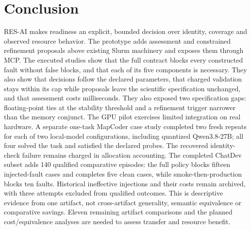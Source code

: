 \documentclass[pdflatex,sn-mathphys-num]{sn-jnl}
\theoremstyle{thmstylethree}
\newcommand{\tool}{\textsc{RES-AI}}
\begin{document}
\section{Conclusion}\label{sec:conclusion}
\tool{} makes readiness an explicit, bounded decision over identity, coverage and observed resource behavior. The prototype adds assessment and constrained refinement proposals above existing Slurm machinery and exposes them through MCP. The executed studies show that the full contract blocks every constructed fault without false blocks, and that each of its five components is necessary. They also show that decisions follow the declared parameters, that charged validation stays within its cap while proposals leave the scientific specification unchanged, and that assessment costs milliseconds. They also exposed two specification gaps: floating-point ties at the stability threshold and a refinement trigger narrower than the memory conjunct. The GPU pilot exercises limited integration on real hardware. A separate one-task MapCoder case study completed two fresh repeats for each of two local-model configurations, including quantized Qwen3.8-27B; all four solved the task and satisfied the declared probes. The recovered identity-check failure remains charged in allocation accounting. The completed ChatDev subset adds 140 qualified comparative episodes: the full policy blocks fifteen injected-fault cases and completes five clean cases, while smoke-then-production blocks ten faults. Historical ineffective injections and their costs remain archived, with three attempts excluded from qualified outcomes. This is descriptive evidence from one artifact, not cross-artifact generality, semantic equivalence or comparative savings. Eleven remaining artifact comparisons and the planned cost/equivalence analyses are needed to assess transfer and resource benefit.

\end{document}
